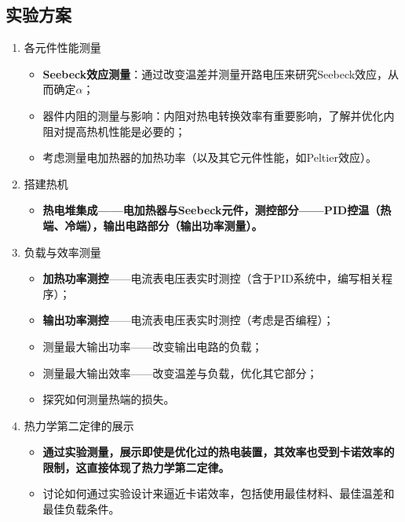 \documentclass[dvipsnames, svgnames,a4paper,11pt]{article}
\begin{document}
    \subsection{实验方案}
    
        \begin{enumerate}
            \item 各元件性能测量
            \begin{itemize}
                \item \textbf{Seebeck效应测量}：通过改变温差并测量开路电压来研究Seebeck效应，从而确定$\alpha$；
                \item 器件内阻的测量与影响：内阻对热电转换效率有重要影响，了解并优化内阻对提高热机性能是必要的；
                \item 考虑测量电加热器的加热功率（以及其它元件性能，如Peltier效应）。
            \end{itemize}
            
            \item 搭建热机
                \begin{itemize}
                    \item \textbf{热电堆集成——电加热器与Seebeck元件，测控部分——PID控温（热端、冷端），输出电路部分（输出功率测量）。}
                \end{itemize}
            
            \item 负载与效率测量
            \begin{itemize}
                \item \textbf{加热功率测控}——电流表电压表实时测控（含于PID系统中，编写相关程序）；
                \item \textbf{输出功率测控}——电流表电压表实时测控（考虑是否编程）；
                \item 测量最大输出功率——改变输出电路的负载；
                \item 测量最大输出效率——改变温差与负载，优化其它部分；
                \item 探究如何测量热端的损失。
            \end{itemize}
            
            \item 热力学第二定律的展示
            \begin{itemize}
                \item \textbf{通过实验测量，展示即使是优化过的热电装置，其效率也受到卡诺效率的限制，这直接体现了热力学第二定律。}
                \item 讨论如何通过实验设计来逼近卡诺效率，包括使用最佳材料、最佳温差和最佳负载条件。
            \end{itemize}			
            

\end{enumerate}
\end{document}
